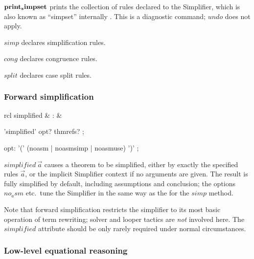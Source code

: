 \begin{descr}

\item [${\mathord{\mathbf{print_simpset}}}$] prints the collection of rules declared to
  the Simplifier, which is also known as ``simpset'' internally
  \cite{isabelle-ref}.  This is a diagnostic command; $undo$ does not apply.

\item [$simp$] declares simplification rules.

\item [$cong$] declares congruence rules.

\item [$split$] declares case split rules.

\end{descr}


\subsubsection{Forward simplification}

\begin{matharray}{rcl}
  simplified & : & \isaratt \\
\end{matharray}

\begin{rail}
  'simplified' opt? thmrefs?
  ;

  opt: '(' (noasm | noasmsimp | noasmuse) ')'
  ;
\end{rail}

\begin{descr}
  
\item [$simplified~\vec a$] causes a theorem to be simplified, either by
  exactly the specified rules $\vec a$, or the implicit Simplifier context if
  no arguments are given.  The result is fully simplified by default,
  including assumptions and conclusion; the options $no_asm$ etc.\ tune the
  Simplifier in the same way as the for the $simp$ method.

  Note that forward simplification restricts the simplifier to its most basic
  operation of term rewriting; solver and looper tactics \cite{isabelle-ref}
  are \emph{not} involved here.  The $simplified$ attribute should be only
  rarely required under normal circumstances.

\end{descr}


\subsubsection{Low-level equational reasoning}

